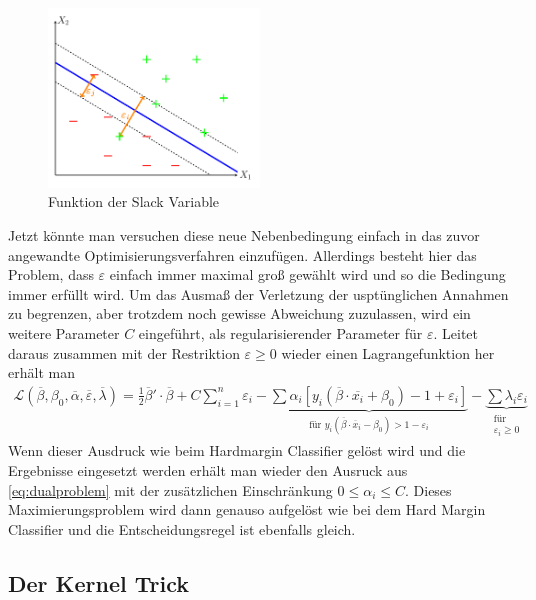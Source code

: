 \documentclass[
]{article}
\begin{document}
\begin{figure}[h]
\centering
\includegraphics[width=0.5\textwidth,trim=0.5cm 0.5cm 0.5cm 0.5cm]{Images/slackvariable.pdf} 
        \caption{Funktion der Slack Variable}
        \label{fig:slackvariable}
\end{figure}

Jetzt könnte man versuchen diese neue Nebenbedingung einfach in das
zuvor angewandte Optimisierungsverfahren einzufügen. Allerdings besteht
hier das Problem, dass \(\varepsilon\) einfach immer maximal groß
gewählt wird und so die Bedingung immer erfüllt wird. Um das Ausmaß der
Verletzung der usptünglichen Annahmen zu begrenzen, aber trotzdem noch
gewisse Abweichung zuzulassen, wird ein weitere Parameter \(C\)
eingeführt, als regularisierender Parameter für \(\varepsilon\). Leitet
daraus zusammen mit der Restriktion \(\varepsilon\ge0\) wieder einen
Lagrangefunktion her erhält man \begin{align}
\mathcal{L}(\overline\beta,\beta_0,\overline\alpha,\overline\varepsilon,\overline\lambda)=\frac{1}{2}\overline\beta'\cdot \overline\beta + C \sum_{i=1}^{n}\varepsilon_i-\underbrace{\sum \alpha_i[y_i(\overline\beta \cdot \overline{x_i}+\beta_0)-1+\varepsilon_i]}_{\text{für }y_i(\overline\beta \cdot \overline{x}_i-\beta_0)>1- \varepsilon_i}-\underbrace{\sum \lambda_i \varepsilon_i }_{\substack{\text{für}\\ \varepsilon_i \ge 0}}
\end{align} Wenn dieser Ausdruck wie beim Hardmargin Classifier gelöst
wird und die Ergebnisse eingesetzt werden erhält man wieder den Ausruck
aus \eqref{eq:dualproblem} mit der zusätzlichen Einschränkung
\(0\le \alpha_i \le C\). Dieses Maximierungsproblem wird dann genauso
aufgelöst wie bei dem Hard Margin Classifier und die Entscheidungsregel
ist ebenfalls gleich.

\subsection{Der Kernel Trick}
\end{document}
